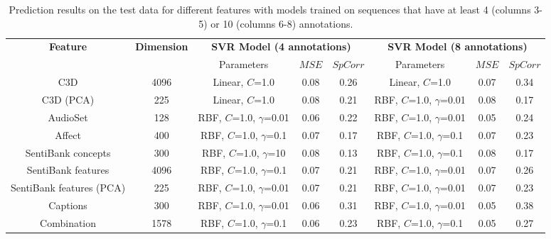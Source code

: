 \documentclass[sigconf]{acmart}
\begin{document}
\begin{table}
  \centering
  \renewcommand{\arraystretch}{1.2}
  \begin{tabular}{|c|c|c|c|c|c|c|c|}
    \hline
    \textbf{Feature} & \textbf{Dimension}& \multicolumn{3}{c|}{\textbf{SVR Model (4 annotations)}} & \multicolumn{3}{c|}{\textbf{SVR Model (8 annotations)}}\\
    \cline{3-8}
    & & Parameters& $MSE$ & $SpCorr$ & Parameters & $MSE$ & $SpCorr$\\ \hline
    C3D& 4096& Linear, $C$=1.0& 0.08& 0.26& Linear, $C$=1.0& 0.07& 0.34\\ \hline
		C3D (PCA)& 225& Linear, $C$=1.0& 0.08& 0.21& RBF, $C$=1.0, $\gamma$=0.01& 0.08& 0.17\\ \hline
		AudioSet& 128& RBF, $C$=1.0, $\gamma$=0.01& 0.06& 0.22& RBF, $C$=1.0, $\gamma$=0.01& 0.05& 0.24\\ \hline
		Affect& 400& RBF, $C$=1.0, $\gamma$=0.1& 0.07& 0.17& RBF, $C$=1.0, $\gamma$=0.1& 0.07& 0.23\\ \hline
		SentiBank concepts& 300& RBF, $C$=1.0, $\gamma$=10& 0.08& 0.13& RBF, $C$=1.0, $\gamma$=0.1& 0.08& 0.17\\ \hline
		SentiBank features& 4096& RBF, $C$=1.0, $\gamma$=0.1& 0.07& 0.21& RBF, $C$=1.0, $\gamma$=0.01& 0.07& 0.26\\ \hline
		SentiBank features (PCA)& 225& RBF, $C$=1.0, $\gamma$=0.01& 0.07& 0.21& RBF, $C$=1.0, $\gamma$=0.01& 0.07& 0.23\\ \hline
		Captions& 300& RBF, $C$=1.0, $\gamma$=0.01& 0.06& 0.31& RBF, $C$=1.0, $\gamma$=0.01& 0.05& 0.38 \\ \hline
		Combination& 1578& RBF, $C$=1.0, $\gamma$=0.1& 0.06& 0.23& RBF, $C$=1.0, $\gamma$=0.1& 0.05& 0.27\\ \hline		
    \hline
  \end{tabular}
  \caption{Prediction results on the test data for different features with models trained on sequences that have at least 4 (columns 3-5) or 10 (columns 6-8) annotations.}
	\label{res-4-10-ann}	
\end{table}
\end{document}
